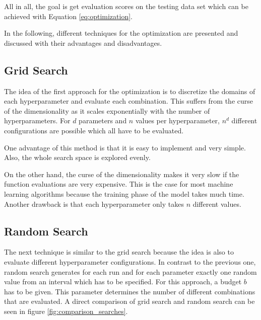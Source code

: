 All in all, the goal is get evaluation scores on the testing data set which can be achieved with Equation \ref{eq:optimization}. 
\cite{feurer2019hyperparameter,bischl2021hyperparameter}

In the following, different techniques for the optimization are presented and discussed with their advantages and disadvantages.

\subsection{Grid Search}
The idea of the first approach for the optimization is to discretize the domains of each hyperparameter and evaluate each combination. This suffers from the curse of the dimensionality as it scales exponentially with the number of hyperparameters. For $ d $ parameters and $ n $ values per hyperparameter, $ n^d $ different configurations are possible which all have to be evaluated. 

One advantage of this method is that it is easy to implement and very simple. Also, the whole search space is explored evenly.

On the other hand, the curse of the dimensionality makes it very slow if the function evaluations are very expensive. This is the case for most machine learning algorithms because the training phase of the model takes much time. Another drawback is that each hyperparameter only takes $ n $ different values.


\subsection{Random Search}
The next technique \cite{random_search} is similar to the grid search because the idea is also to evaluate different hyperparameter configurations. In contrast to the previous one, random search generates for each run and for each parameter exactly one random value from an interval which has to be specified. For this approach, a budget $ b $ has to be given. This parameter determines the number of different combinations that are evaluated. A direct comparison of grid search and random search can be seen in figure \ref{fig:comparison_searches}.

